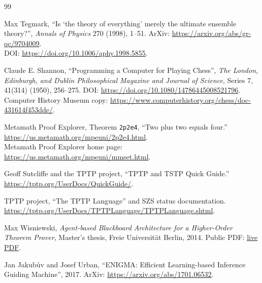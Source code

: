 \documentclass[11pt,openany]{book}
\theoremstyle{definition}
\theoremstyle{remark}
\begin{document}
\backmatter
\renewcommand{\bibname}{References and live links}
\begin{thebibliography}{99}

Max Tegmark,
``Is `the theory of everything' merely the ultimate ensemble theory?'',
\emph{Annals of Physics} 270 (1998), 1--51.
ArXiv: \href{https://arxiv.org/abs/gr-qc/9704009}{https://arxiv.org/abs/gr-qc/9704009}.\\
DOI: \href{https://doi.org/10.1006/aphy.1998.5855}{https://doi.org/10.1006/aphy.1998.5855}.

Claude E. Shannon,
``Programming a Computer for Playing Chess'',
\emph{The London, Edinburgh, and Dublin Philosophical Magazine and Journal of Science}, Series 7, 41(314) (1950), 256--275.
DOI: \href{https://doi.org/10.1080/14786445008521796}{https://doi.org/10.1080/14786445008521796}.\\
Computer History Museum copy: \href{https://www.computerhistory.org/chess/doc-431614f453dde/}{https://www.computerhistory.org/chess/doc-431614f453dde/}.

Metamath Proof Explorer,
Theorem \texttt{2p2e4}, ``Two plus two equals four.''
\href{https://us.metamath.org/mpeuni/2p2e4.html}{https://us.metamath.org/mpeuni/2p2e4.html}.\\
Metamath Proof Explorer home page:
\href{https://us.metamath.org/mpeuni/mmset.html}{https://us.metamath.org/mpeuni/mmset.html}.

Geoff Sutcliffe and the TPTP project,
``TPTP and TSTP Quick Guide.''
\href{https://tptp.org/UserDocs/QuickGuide/}{https://tptp.org/UserDocs/QuickGuide/}.

TPTP project,
``The TPTP Language'' and SZS status documentation.
\href{https://tptp.org/UserDocs/TPTPLanguage/TPTPLanguage.shtml}{https://tptp.org/UserDocs/TPTPLanguage/TPTPLanguage.shtml}.

Max Wisniewski,
\emph{Agent-based Blackboard Architecture for a Higher-Order Theorem Prover}, Master's thesis, Freie Universit\"at Berlin, 2014.
Public PDF: \href{https://www.mi.fu-berlin.de/inf/groups/ag-ki/Theses/Completed-theses/Master_Diploma-theses/2014/Wisniewski/Master-Wisniewski1.pdf}{live PDF}.

Jan Jakub\r{u}v and Josef Urban,
``ENIGMA: Efficient Learning-based Inference Guiding Machine'', 2017.
ArXiv: \href{https://arxiv.org/abs/1701.06532}{https://arxiv.org/abs/1701.06532}.


\end{thebibliography}
\end{document}
